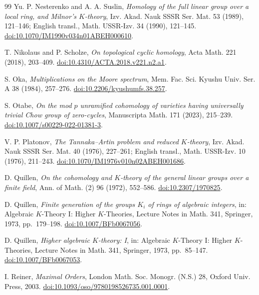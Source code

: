 \begin{thebibliography}{99}
 Yu. P. Nesterenko and A. A. Suslin,
\emph{Homology of the full linear group over a local ring, and Milnor's $K$-theory},
Izv. Akad. Nauk SSSR Ser. Mat. 53 (1989), 121--146;
English transl., Math. USSR-Izv. 34 (1990), 121--145.
\href{https://doi.org/10.1070/IM1990v034n01ABEH000610}{doi:10.1070/IM1990v034n01ABEH000610}.

 T. Nikolaus and P. Scholze,
\emph{On topological cyclic homology},
Acta Math. 221 (2018), 203--409.
\href{https://doi.org/10.4310/ACTA.2018.v221.n2.a1}{doi:10.4310/ACTA.2018.v221.n2.a1}.

 S. Oka,
\emph{Multiplications on the Moore spectrum},
Mem. Fac. Sci. Kyushu Univ. Ser. A 38 (1984), 257--276.
\href{https://doi.org/10.2206/kyushumfs.38.257}{doi:10.2206/kyushumfs.38.257}.

 S. Otabe,
\emph{On the mod $p$ unramified cohomology of varieties having universally trivial Chow group of zero-cycles},
Manuscripta Math. 171 (2023), 215--239.
\href{https://doi.org/10.1007/s00229-022-01381-3}{doi:10.1007/s00229-022-01381-3}.

 V. P. Platonov,
\emph{The Tannaka--Artin problem and reduced $K$-theory},
Izv. Akad. Nauk SSSR Ser. Mat. 40 (1976), 227--261;
English transl., Math. USSR-Izv. 10 (1976), 211--243.
\href{https://doi.org/10.1070/IM1976v010n02ABEH001686}{doi:10.1070/IM1976v010n02ABEH001686}.

 D. Quillen,
\emph{On the cohomology and $K$-theory of the general linear groups over a finite field},
Ann. of Math. (2) 96 (1972), 552--586.
\href{https://doi.org/10.2307/1970825}{doi:10.2307/1970825}.

 D. Quillen,
\emph{Finite generation of the groups $K_i$ of rings of algebraic integers},
in: Algebraic $K$-Theory I: Higher $K$-Theories, Lecture Notes in Math. 341, Springer, 1973, pp.~179--198.
\href{https://doi.org/10.1007/BFb0067056}{doi:10.1007/BFb0067056}.

 D. Quillen,
\emph{Higher algebraic $K$-theory: I},
in: Algebraic $K$-Theory I: Higher $K$-Theories, Lecture Notes in Math. 341, Springer, 1973, pp.~85--147.
\href{https://doi.org/10.1007/BFb0067053}{doi:10.1007/BFb0067053}.

 I. Reiner,
\emph{Maximal Orders},
London Math. Soc. Monogr. (N.S.) 28, Oxford Univ. Press, 2003.
\href{https://doi.org/10.1093/oso/9780198526735.001.0001}{doi:10.1093/oso/9780198526735.001.0001}.


\end{thebibliography}
